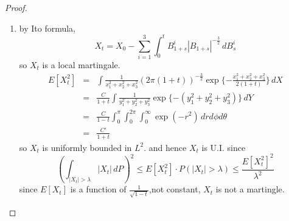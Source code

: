 \documentclass{article}     %
\begin{document}
\begin{proof}
\begin{enumerate}[(1)]
    \item by Ito formula, 
     \[X_t = X_0 - \sum_{i=1}^3\int_0^t B^i_{1+s}|B_{1+s}|^{-\frac{3}{2}}\,d B^i_s\]
     so $X_t$ is a local martingale.
    \begin{eqnarray*}
        E[X_t^2] &=& \int \frac{1}{x_1^2+x_2^2+x_3^2}(2\pi (1+t))^{-\frac{3}{2}}\exp\{-\frac{x_1^2+x_2^2+x_3^2}{2(1+t)}\}\,dX\\
         & = &\frac{C}{1+t} \int \frac{1}{y_1^2+y_2^2+y_3^2}\exp\{-(y_1^2+y_2^2+y_3^2)\}\,dY\\
         & = &\frac{C}{1-t}\int_0^{\pi}\int_0^{2\pi}\int_0^{\infty}\exp(-r^2)\,drd\phi d\theta \\
         & = & \frac{C'}{1+t}
        \end{eqnarray*}
        so $X_t$ is uniformly bounded in $L^2$.  and hence $X_t$ is U.I. since
        \[ (\int_{|X_t|>\lambda}|X_t|\,dP)^2\leq E[X_t^2]\cdot P(|X_t|>\lambda)\leq \frac{E[X^2_t]^2}{\lambda^2}\]
    since $E[X_t]$ is a function of $\frac{1}{\sqrt{1-t}}$,not constant, $X_t$ is not a martingle.  
    

\end{enumerate}
\end{proof}
\end{document}
